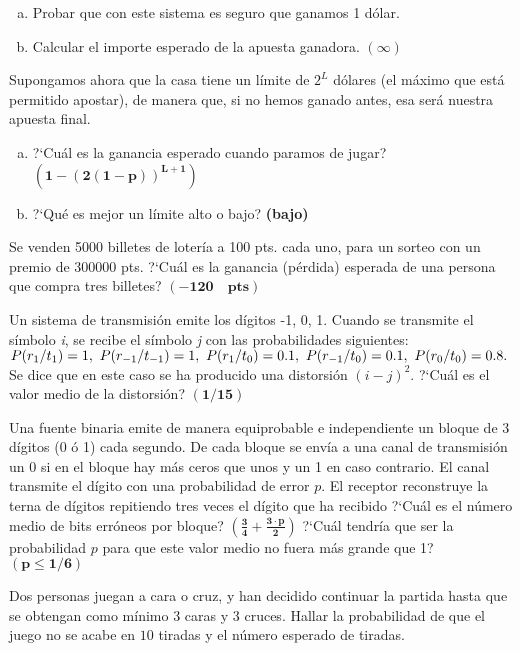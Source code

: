 \documentclass[12pt]{article}
\begin{document}
\begin{enumerate}[a)]
\item Probar  que con este sistema es seguro que ganamos 1 dólar.
\item Calcular el importe esperado de la apuesta ganadora. $\mathbf{(\infty)}$
\end{enumerate}


Supongamos ahora que la casa tiene un límite de $2^L$ dólares (el máximo que está permitido
apostar), de manera que, si no hemos ganado antes, esa será nuestra apuesta final.

\begin{enumerate}[a)]
\item  ?`Cuál es la ganancia esperado cuando paramos de jugar?
$\mathbf{(1-(2(1-p))^{L+1})}$
\item ?`Qué es mejor un límite alto o bajo?  \textbf{(bajo)}
\end{enumerate}

\probl Se venden 5000 billetes de lotería a 100 pts. cada uno, para  un sorteo con un
premio de  300000 pts. ?`Cuál es la ganancia (pérdida) esperada de una persona que compra
tres billetes? $\mathbf{(-120\quad \textrm{pts})}$


\probl Un sistema de transmisión emite los dígitos -1, 0, 1. Cuando se transmite el símbolo
{\it i}, se recibe el símbolo {\it j} con las probabilidades siguientes: $ P(r_1 / t_1) =
1, \ P(r_{-1} / t_{-1}) = 1, \ P(r_1 / t_0) = 0.1, \ P(r_{-1} / t_0) = 0.1, \ P(r_0
/ t_0) = 0.8. $ Se dice que en este caso se ha producido una distorsión $ \displaystyle
(i-j)^2. $ ?`Cuál es el valor medio de la distorsión? $\mathbf{(1/15)}$

\probl Una fuente  binaria emite de manera equiprobable e independiente un bloque  de 3
dígitos (0 ó 1) cada segundo. De cada bloque se envía a una canal de transmisión un 0 si en
el bloque hay más ceros que unos y un 1 en caso contrario. El canal transmite el dígito con
una probabilidad de error $p$. El receptor reconstruye la terna de dígitos repitiendo tres
veces el dígito que ha recibido ?`Cuál es el número medio de bits erróneos por bloque?
$\mathbf{(\frac{3}{4}+\frac{3\cdot p}{2})}$ ?`Cuál tendría que ser la probabilidad $p$ para
que este valor medio no fuera más grande que 1?  $\mathbf{(p \leq 1/6)}$

\probl  Dos personas juegan a cara o cruz, y han decidido continuar la partida hasta que se
obtengan como mínimo $3$ caras  y $3$ cruces. Hallar la probabilidad de que el juego no se
acabe en $10$ tiradas y el número esperado de tiradas.
\end{document}
